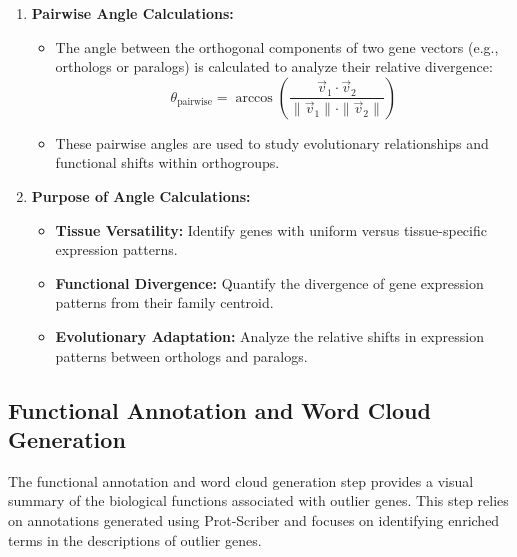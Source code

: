 \documentclass{article}
\begin{document}
\begin{enumerate}
    \item \textbf{Pairwise Angle Calculations:}
    \begin{itemize}
        \item The angle between the orthogonal components of two gene vectors (e.g., orthologs or paralogs) is calculated to analyze their relative divergence:
        \[
        \theta_{\text{pairwise}} = \arccos\left(\frac{\vec{v}_1 \cdot \vec{v}_2}{\|\vec{v}_1\| \cdot \|\vec{v}_2\|}\right)
        \]
        \item These pairwise angles are used to study evolutionary relationships and functional shifts within orthogroups.
    \end{itemize}

    \item \textbf{Purpose of Angle Calculations:}
    \begin{itemize}
        \item \textbf{Tissue Versatility:} Identify genes with uniform versus tissue-specific expression patterns.
        \item \textbf{Functional Divergence:} Quantify the divergence of gene expression patterns from their family centroid.
        \item \textbf{Evolutionary Adaptation:} Analyze the relative shifts in expression patterns between orthologs and paralogs.
    \end{itemize}
\end{enumerate}

\subsection{Functional Annotation and Word Cloud Generation}
The functional annotation and word cloud generation step provides a visual summary of the biological functions associated with outlier genes. This step relies on annotations generated using Prot-Scriber and focuses on identifying enriched terms in the descriptions of outlier genes.
\end{document}
